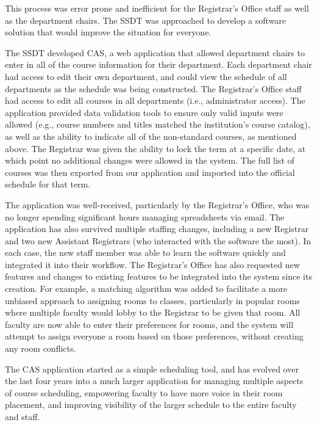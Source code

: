 This process was error prone and inefficient for the Registrar's Office staff as well as the department chairs. The SSDT was approached to develop a software solution that would improve the situation for everyone. 

The SSDT developed CAS, a web application that allowed department chairs to enter in all of the course information for their department. Each department chair had access to edit their own department, and could view the schedule of all departments as the schedule was being constructed. The Registrar's Office staff had access to edit all courses in all departments (i.e., administrator access). The application provided data validation tools to ensure only valid inputs were allowed (e.g., course numbers and titles matched the institution's course catalog), as well as the ability to indicate all of the non-standard courses, as mentioned above. The Registrar was given the ability to lock the term at a specific date, at which point no additional changes were allowed in the system. The full list of courses was then exported from our application and imported into the official schedule for that term. 

The application was well-received, particularly by the Registrar's Office, who was no longer spending significant hours managing spreadsheets via email. The application has also survived multiple staffing changes, including a new Registrar and two new Assistant Registrars (who interacted with the software the most). In each case, the new staff member was able to learn the software quickly and integrated it into their workflow. The Registrar's Office has also requested new features and changes to existing features to be integrated into the system since its creation. For example, a matching algorithm was added to facilitate a more unbiased approach to assigning rooms to classes, particularly in popular rooms where multiple faculty would lobby to the Registrar to be given that room. All faculty are now able to enter their preferences for rooms, and the system will attempt to assign everyone a room based on those preferences, without creating any room conflicts. 

The CAS application started as a simple scheduling tool, and has evolved over the last four years into a much larger application for managing multiple aspects of course scheduling, empowering faculty to have more voice in their room placement, and improving visibility of the larger schedule to the entire faculty and staff.

